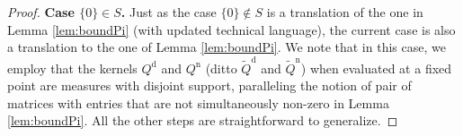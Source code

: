 \documentclass[11pt,leqno]{amsart}
\numberwithin{table}{section}
\numberwithin{figure}{section}
\numberwithin{equation}{section}
\newcommand{\1}{{\mathds{1}}}
\newcommand{\0}{\mat{0}}
\newcommand{\tld}[1]{\widetilde{#1}}
\begin{document}
{{\begin{proof}
\textbf{Case $\{0\}\in S$.} Just as the case $\{0\}\notin S$ is a translation of the one in Lemma \ref{lem:boundPi} (with updated technical language), the current case is also a translation to the one of Lemma \ref{lem:boundPi}. We note that in this case, we employ that the kernels $Q^{\mathrm{d}}$ and  $Q^{\mathrm{n}}$ (ditto $\tld{Q}^{\mathrm{d}}$ and  $\tld{Q}^{\mathrm{n}}$) when evaluated at a fixed point are measures with disjoint support, paralleling the notion of pair of matrices with entries that are not simultaneously non-zero in Lemma \ref{lem:boundPi}. All the other steps are straightforward to generalize.

\end{proof}}}
\end{document}

